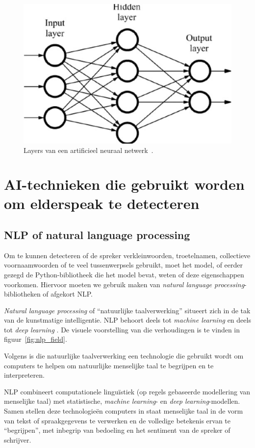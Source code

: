 \begin{figure}
    \centering
    \includegraphics[width=.5\textwidth]{./img/layers}
    \caption{\label{fig:layers} Layers van een artificieel neuraal netwerk~\autocite{Lievens2021}.}
\end{figure}


\section{AI-technieken die gebruikt worden om elderspeak te detecteren}

\subsection{NLP of natural language processing}
Om te kunnen detecteren of de spreker verkleinwoorden, troetelnamen, collectieve voornaamwoorden of te veel tussenwerpsels gebruikt, moet het model, of eerder gezegd de Python-bibliotheek die het model bevat, weten of deze eigenschappen voorkomen. Hiervoor moeten we gebruik maken van \textit{natural language processing}-bibliotheken of afgekort NLP.

\textit{Natural language processing} of ``natuurlijke taalverwerking'' situeert zich in de tak van de kunstmatige intelligentie. NLP behoort deels tot \textit{machine learning} en deels tot \textit{deep learning} \autocite{Kleinings2022}. De visuele voorstelling van die verhoudingen is te vinden in figuur~\ref{fig:nlp_field}.

Volgens \textcite{Kleinings2022} is die natuurlijke taalverwerking een technologie die gebruikt wordt om computers te helpen om natuurlijke menselijke taal te begrijpen en te interpreteren.

NLP combineert computationele linguïstiek (op regels gebaseerde modellering van menselijke taal) met statistische, \textit{machine learning}- en \textit{deep learning}-modellen. Samen stellen deze technologieën computers in staat menselijke taal in de vorm van tekst of spraakgegevens te verwerken en de volledige betekenis ervan te ``begrijpen'', met inbegrip van bedoeling en het sentiment van de spreker of schrijver.~\autocite{IBMCloudEducation2021}

